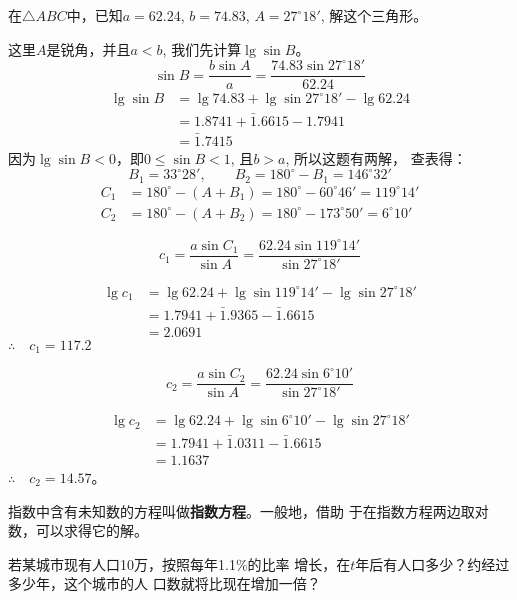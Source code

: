 \begin{example}
    在$\triangle ABC$中，已知$a=62.24$, $b=74.83$, $A=
27^{\circ}18'$, 解这个三角形。
\end{example}

\begin{solution}
    这里$A$是锐角，并且$a<b$, 我们先计算$\lg\sin B$。
\[\sin B=\frac{b\sin A}{a}=\frac{74.83\sin 27^{\circ}18'}{62.24}\]
\[\begin{split}
    \lg\sin B&=\lg 74.83+\lg \sin 27^{\circ}18'-\lg 62.24\\
&=1.8741+\bar{1}.6615-1.7941\\
&=\bar{1}.7415
\end{split}\] 
因为$\lg\sin B<0$，即$0\le \sin B<1$, 且$b>a$, 所以这题有两解，
查表得：
\[B_1=33^{\circ}28',\qquad B_2=180^{\circ}-B_1=146^{\circ}32'\]
\[\begin{split}
    C_1&=180^{\circ}-(A+B_1)=180^{\circ}-60^{\circ}46' =119^{\circ}14' \\
    C_2&=180^{\circ}-(A+B_2)=180^{\circ}-173^{\circ}50'=6^{\circ}10'
\end{split}\]

\[c_1=\frac{a\sin C_1}{\sin A}=\frac{62.24\sin 119^{\circ}14'}{\sin 27^{\circ}18'}\]

\[\begin{split}
    \lg c_1&= \lg 62.24+\lg \sin 119^{\circ}14'-\lg \sin 27^{\circ}18'\\
    &=1.7941+\bar{1}.9365-\bar{1}.6615\\
    &=2.0691
\end{split}\]
$\therefore\quad c_1=117.2$

\[c_2=\frac{a\sin C_2}{\sin A}=\frac{62.24\sin 6^{\circ}10'}{\sin 27^{\circ}18'}\]

\[\begin{split}
    \lg c_2&= \lg 62.24+\lg \sin 6^{\circ}10'-\lg \sin 27^{\circ}18'\\
    &=1.7941+\bar{1}.0311-\bar{1}.6615\\
    &=1.1637
\end{split}\]
$\therefore\quad c_2=14.57$。
\end{solution}  

指数中含有未知数的方程叫做\textbf{指数方程}。一般地，借助
于在指数方程两边取对数，可以求得它的解。

\begin{example}
    若某城市现有人口10万，按照每年1.1\%的比率
    增长，在$t$年后有人口多少？约经过多少年，这个城市的人
    口数就将比现在增加一倍？
\end{example}

